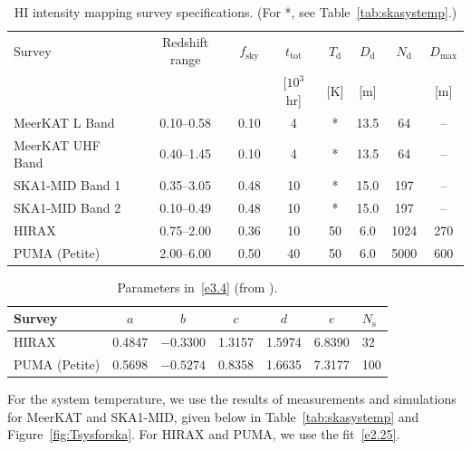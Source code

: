 \begin{table}[ht]
\footnotesize
\centering
\caption{\label{tab:hisurveyspecs} HI intensity mapping survey specifications. 
(For *, see Table~\ref{tab:skasystemp}.)} 
\vspace*{0.2cm}
\begin{tabular}{|lccccccc|} \hline
Survey & Redshift range & $f_\mathrm{sky}$ & $t_{\mathrm{tot}}$  & $T_{\mathrm{d}}$ & $D_\mathrm{d}$ & $N_\mathrm{d}$ & $D_\mathrm{max}$ \\
&  & & [$10^{3}$ hr] & [K]  & [m] & & {[m]} \\
\hline\hline 
MeerKAT L Band   & 0.10--0.58 & 0.10 & 4  & * & 13.5 & 64 & -- \\
MeerKAT UHF Band & 0.40--1.45 & 0.10 & 4  & * & 13.5 & 64  & --  \\
SKA1-MID Band 1  & 0.35--3.05 & 0.48 & 10 & * & 15.0 & 197  & --  \\
SKA1-MID Band 2  & 0.10--0.49 & 0.48 & 10 & * & 15.0 & 197  & --  \\
HIRAX            & 0.75--2.00 & 0.36 & 10 & 50 & 6.0  & 1024  & 270\\
PUMA (Petite)    & 2.00--6.00 & 0.50 & 40 & 50 & 6.0  & 5000 & 600 \\
\hline
\end{tabular}
\end{table}

\vspace*{-0.5cm}
\begin{table}[ht]
\centering
\caption{\label{tab2} Parameters in~\eqref{e3.4} (from \cite{Ansari:2018ury}).} 
\vspace*{0.2cm}
\begin{tabular}{|lcccccl|} \hline
Survey & $a$ & $b$ & $c$  & $d$ & $e$ & $N_\mathrm{s}$  \\ \hline\hline 
HIRAX & 0.4847 & $-0.3300$ & 1.3157 & 1.5974 & 6.8390 & 32  \\
PUMA (Petite) & 0.5698 & $-0.5274$ & 0.8358 & 1.6635 & 7.3177 & {100} \\
\hline
\end{tabular}
\end{table}

For the system temperature, we use the results of measurements and simulations for MeerKAT and SKA1-MID, given below in Table~\ref{tab:skasystemp} and Figure~\ref{fig:Tsysforska}. For HIRAX and PUMA, we use the fit~\eqref{e2.25}. 

